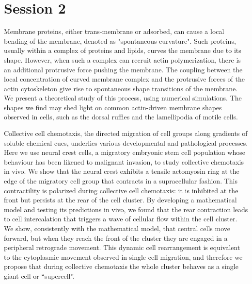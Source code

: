 \documentclass{article}
\begin{document}
\section*{Session 2}
\vspace{10pt}
{
Membrane proteins, either trans-membrane or adsorbed, can cause a local bending of the membrane, denoted as "spontaneous curvature". Such proteins, usually within a complex of proteins and lipids, curves the membrane due to its shape. However, when such a complex can recruit actin polymerization, there is an additional protrusive force pushing the membrane. The coupling between the local concentration of curved membrane complex and the protrusive forces of the actin cytoskeleton give rise to spontaneous shape transitions of the membrane. We present a theoretical study of this process, using numerical simulations. The shapes we find may shed light on common actin-driven membrane shapes observed in cells, such as the dorsal ruffles and the lamellipodia of motile cells.

}

{
Collective cell chemotaxis, the directed migration of cell groups along gradients of soluble chemical cues, underlies various developmental and pathological processes. Here we use neural crest cells, a migratory embryonic stem cell population whose behaviour has been likened to malignant invasion, to study collective chemotaxis in vivo. We show that the neural crest exhibits a tensile actomyosin ring at the edge of the migratory cell group that contracts in a supracellular fashion. This contractility is polarized during collective cell chemotaxis: it is inhibited at the front but persists at the rear of the cell cluster. By developing a mathematical model and testing its predictions in vivo, we found that the rear contraction leads to cell intercalation that triggers a wave of cellular flow within the cell cluster.  We show, consistently with the mathematical model, that central cells move forward, but when they reach the front of the cluster they are engaged in a peripheral retrograde movement.  This dynamic cell rearrangement is equivalent to the cytoplasmic movement observed in single cell migration, and therefore we propose that during collective chemotaxis the whole cluster behaves as a single giant cell or “supercell”.
}
\end{document}
